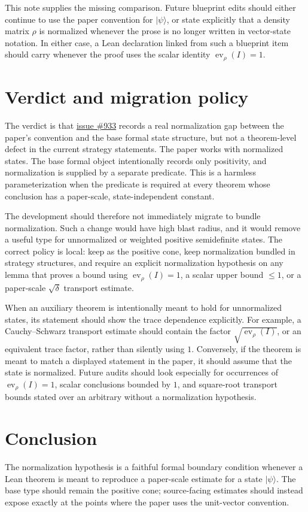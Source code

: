\documentclass[11pt]{article}
\newcommand{\ev}{\operatorname{ev}}
\begin{document}
This note supplies the missing comparison.  Future blueprint edits should either
continue to use the paper convention for $|\psi\rangle$, or state explicitly that
a density matrix \(\rho\) is normalized whenever the prose is no longer written
in vector-state notation.  In either case, a Lean declaration linked from such a
blueprint item should carry  whenever the proof uses the
scalar identity \(\ev_\rho(I)=1\).

\section{Verdict and migration policy}

The verdict is that \href{https://github.com/LionSR/MIPStarRE/issues/933}{issue
\#933} records a real normalization gap between the paper's convention and the
base formal state structure, but not a theorem-level defect in the current
strategy statements. The paper works with normalized states. The base formal
object intentionally records only positivity, and normalization is supplied by a
separate predicate. This is a harmless parameterization when the predicate is
required at every theorem whose conclusion has a paper-scale, state-independent
constant.

The development should therefore not immediately migrate  to
bundle normalization. Such a change would have high blast radius, and it would
remove a useful type for unnormalized or weighted positive semidefinite states.
The correct policy is local: keep  as the positive cone, keep
normalization bundled in strategy structures, and require an explicit
normalization hypothesis on any lemma that proves a bound using
$\ev_\rho(I)=1$, a scalar upper bound $\le 1$, or a paper-scale
$\sqrt\delta$ transport estimate.

When an auxiliary theorem is intentionally meant to hold for unnormalized
states, its statement should show the trace dependence explicitly. For example,
a Cauchy--Schwarz transport estimate should contain the factor
$\sqrt{\ev_\rho(I)}$, or an equivalent trace factor, rather than silently using
$1$. Conversely, if the theorem is meant to match a displayed statement in
the paper, it should assume that the state is normalized. Future audits should
look especially for occurrences of $\ev_\rho(I)=1$, scalar conclusions bounded
by $1$, and square-root transport bounds stated over an arbitrary
 without a normalization hypothesis.

\section{Conclusion}

The normalization hypothesis is a faithful formal boundary condition whenever a
Lean theorem is meant to reproduce a paper-scale estimate for a state
$|\psi\rangle$.  The base  type should remain the positive
cone; source-facing estimates should instead expose
 exactly at the points where the paper uses
the unit-vector convention.



\end{document}
